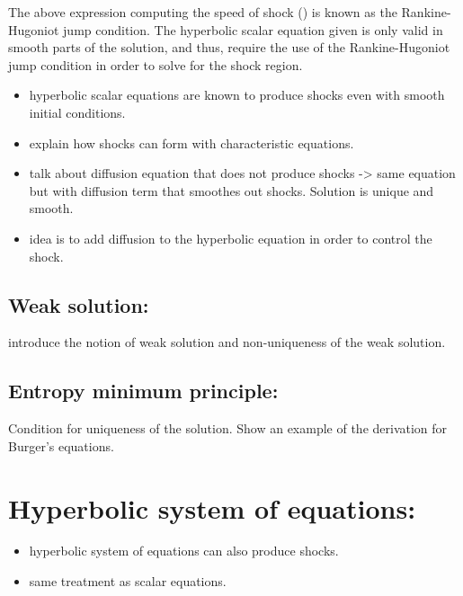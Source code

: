 %
The above expression computing the speed of shock () is known as the Rankine-Hugoniot jump condition. The hyperbolic scalar equation given  is only valid in smooth parts of the solution, and thus, require the use of the Rankine-Hugoniot jump condition in order to solve for the shock region.   
\begin{itemize}
\item hyperbolic scalar equations are known to produce shocks even with smooth initial conditions.
\item explain how shocks can form with characteristic equations.
\item talk about diffusion equation that does not produce shocks -> same equation but with diffusion term that smoothes out shocks. Solution is unique and smooth.
\item idea is to add diffusion to the hyperbolic equation in order to control the shock.
\end{itemize}
%
\subsection{Weak solution:}
introduce the notion of weak solution and non-uniqueness of the weak solution.
%
\subsection{Entropy minimum principle:}
Condition for uniqueness of the solution. Show an example of the derivation for Burger's equations.
%
\section{Hyperbolic system of equations:}
%
\begin{itemize}
\item hyperbolic system of equations can also produce shocks.
\item same treatment as scalar equations.
\end{itemize}